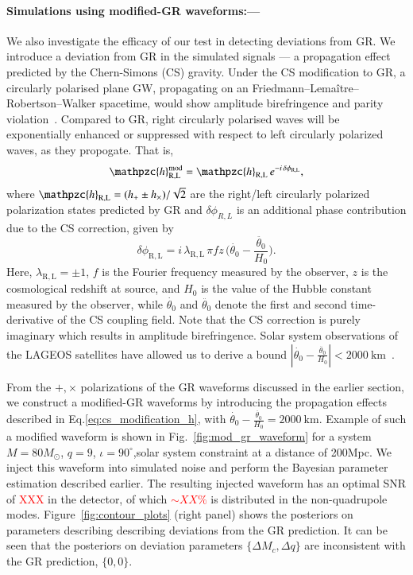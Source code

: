 \documentclass[prl,preprintnumbers,twocolumn,eqsecnum,floatfix,a4paper,nofootinbib,superscriptaddress]{revtex4}
\newcommand{\red}[1]{\textcolor{red}{#1}}
\newcommand{\h}{\mathpzc{h}}
\begin{document}
\paragraph{Simulations using modified-GR waveforms:---}

We also investigate the efficacy of our test in detecting deviations from GR. We introduce a deviation from GR in the simulated signals --- a propagation effect predicted by the Chern-Simons (CS) gravity. Under the CS modification to GR, a circularly polarised plane GW, propagating on an Friedmann–Lema\^itre–Robertson–Walker spacetime, would show amplitude birefringence and parity violation~\cite{Yunes:2010yf}. Compared to GR, right circularly polarised waves will be exponentially enhanced or suppressed with respect to left circularly polarized waves, as they propogate. That is, 
% 
\begin{equation}
\h_\mathrm{R,L}^\mathrm{mod} = \h_\mathrm{R,L} \, e^{-i \, \delta\phi_\mathrm{R,L}},
\label{eq:cs_modification_h}
\end{equation}
where $\h_\mathrm{R,L} = (h_+ \pm h_\times)/\sqrt{2}$ are the right/left circularly polarized polarization states predicted by GR and $\delta \phi_{R,L}$ is an additional phase contribution due to the CS correction, given by 
\begin{equation}
\delta \phi_\mathrm{R,L}=i \, \lambda_\mathrm{R,L} \, \pi f z \, \Big(\dot{\theta_0}-\frac{\ddot{\theta_0}}{H_0}\Big).
\label{eq:cs_modification_dphi}
\end{equation}
Here, $\lambda_\mathrm{R,L}=\pm1$, $f$ is the Fourier frequency measured by the observer, $z$ is the cosmological redshift at source, and ${H_0}$ is the value of the Hubble constant measured by the observer, while $\dot{\theta_0}$ and $\ddot{\theta_0}$ denote the first and second time-derivative of the CS coupling field. Note that the CS correction is purely imaginary which results in amplitude birefringence. Solar system observations of the LAGEOS satellites have allowed us to derive a bound $|\dot{\theta_0}-\frac{\ddot{\theta_0}}{H_0}| < 2000~\mathrm{km}$~\cite{Yunes:2010yf,Smith:2007jm}.

From the $+,\times$ polarizations of the GR waveforms discussed in the earlier section, we construct a modified-GR waveforms by introducing the propagation effects described in Eq.\eqref{eq:cs_modification_h}, with $\dot{\theta_0}-\frac{\ddot{\theta_0}}{H_0} = 2000~\mathrm{km}$. Example of such a modified waveform is shown in Fig.~\ref{fig:mod_gr_waveform} for a system $M = 80M_{\odot}$, $q =9$, $\iota = 90^{\circ}$,solar system constraint at a distance of 200Mpc. We inject this waveform into simulated noise and perform the Bayesian parameter estimation described earlier. The resulting injected waveform has an optimal SNR of \red{XXX} in the detector, of which \red{$\sim XX\%$} is distributed in the non-quadrupole modes. Figure~\ref{fig:contour_plots} (right panel) shows the posteriors on parameters describing describing deviations from the GR prediction. It can be seen that the posteriors on deviation parameters $\{\Delta M_c, \Delta q\}$ are inconsistent with the GR prediction, $\{0, 0\}$. 
\end{document}
